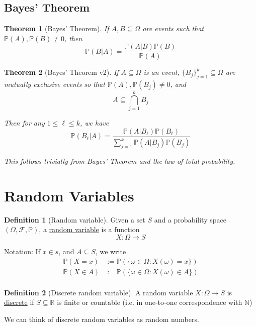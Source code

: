\documentclass[
]{article}
\newtheorem{theorem}{Theorem}[section]
\theoremstyle{definition}
\newtheorem{definition}{Definition}[section]
\theoremstyle{definition}
\theoremstyle{definition}
\theoremstyle{remark}
\newcommand{\prob}[1]{\mathbb{P}\left(#1\right)}
\begin{document}
\subsection{Bayes' Theorem}

\begin{theorem}[Bayes' Theorem]
  If $A,B\subseteq\Omega$ are events such that $\prob{A},\prob{B}\neq 0$, then
  \[\prob{B|A}=\frac{\prob{A|B}\prob{B}}{\prob{A}}\]
\end{theorem}

\begin{theorem}[Bayes' Theorem v2]
  If $A\subseteq\Omega$ is an event, $\{B_j\}_{j=1}^k\subseteq\Omega$ are mutually exclusive events so that $\prob{A},\prob{B_j}\neq0$, and \[A\subseteq\bigcap_{j=1}^k B_j\]

  Then for any $1\leq \ell\leq k$, we have
  \[\prob{B_\ell|A}=\frac{\prob{A|B_\ell}\prob{B_\ell}}{\sum_{j=1}^k\prob{A|B_j}\prob{B_j}}\]

  This follows trivially from Bayes' Theorem and the law of total probability.

\end{theorem}

\section{Random Variables}

\begin{definition}[Random variable]
  Given a set $S$ and a probability space $(\Omega,\mathcal{F},\mathbb{P})$, a \underline{random variable} is a function \[X:\Omega\to S\]

  Notation: If $x\in s$, and $A\subseteq S$, we write
  \begin{align*}
    \prob{X=x}    & :=\prob{\{\omega\in\Omega:X(\omega)=x\}}    \\
    \prob{X\in A} & :=\prob{\{\omega\in\Omega:X(\omega)\in A\}} \\
  \end{align*}
\end{definition}

\begin{definition}[Discrete random variable]
  A random variable $X:\Omega\to S$ is \underline{discrete} if $S\subseteq\mathbb{R}$ is finite or countable (i.e. in one-to-one correspondence with $\mathbb{N}$)

  We can think of discrete random variables as random numbers.
\end{definition}
\end{document}
